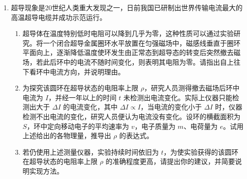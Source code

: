 \documentclass[\gkver]{gaokaozhenti}
\begin{document}
\begin{enumerate}
{由几何关系得 $r=R\tan\frac{\pi}{3}$④

粒子运动过程中洛伦兹力充当向心力，由牛顿第二定律，得

$qvB=m\frac{v^{2}}{r}$⑤

联立④⑤式得 $R=\frac{\sqrt{3}mv}{3qB}$⑥


（3）保持 $M$、$N$ 间电场强度 $E$ 不变，$M$ 板向上平移 $\frac{2}{3}d$ 后，设板间电压为 $U'$，则 $U'=\frac{Ed}{3}=\frac{U}{3}$⑦

设粒子进入 $S$ 孔时的速度为 $v'$，由①式看出 $\frac{U'}{U}=\frac{v'^{2}}{v^{2}}$，结合⑦式可得

$v'=\frac{\sqrt{3}}{3}v$⑧

设粒子做圆周运动的半径为 $r'$，则

$r'=\frac{\sqrt{3}mv}{3qB}$⑨

设粒子从 $S$ 到第一次与圆筒碰撞期间的轨道所对圆心角为 $\theta$，比较⑥⑨两式得到 $r'=R$，可见 $\theta=\frac{\pi}{2}$⑩

粒子须经过这样的圆弧才能从 $S$ 孔射出，故

$n=3$
}

\item
超导现象是20世纪人类重大发现之一，日前我国已研制出世界传输电流最大的高温超导电缆并成功示范运行。
\begin{enumerate}
	\item
	超导体在温度特别低时电阻可以降到几乎为零，这种性质可以通过实验研究。将一个闭合超导金属圈环水平放置在匀强磁场中，磁感线垂直于圈环平面向上，逐渐降低温度使环发生由正常态到超导态的转变后突然撤去磁场，若此后环中的电流不随时间变化，则表明其电阻为零。请指出自上往下看环中电流方向，并说明理由。
	\item
	为探究该圆环在超导状态的电阻率上限 $\rho$，研究人员测得撤去磁场后环中电流为 $I$，并经一年以上的时间 $t$ 未检测出电流变化。实际上仪器只能检测出大于 $\Delta I$ 的电流变化，其中 $\Delta I\propto I$，当电流的变化小于 $\Delta I$ 时，仪器检测不出电流的变化，研究人员便认为电流没有变化。设环的横截面积为 $S$，环中定向移动电子的平均速率为 $v$，电子质量为 $m$、电荷量为 $e$。试用上述给出的各物理量，推导出 $\rho$ 的表达式。
	\item
	若仍使用上述测量仪器，实验持续时间依旧为 $t$，为使实验获得的该圆环在超导状态的电阻率上限 $\rho$ 的准确程度更高，请提出你的建议，并简要说明实现方法。
\end{enumerate}


\end{enumerate}
\end{document}
